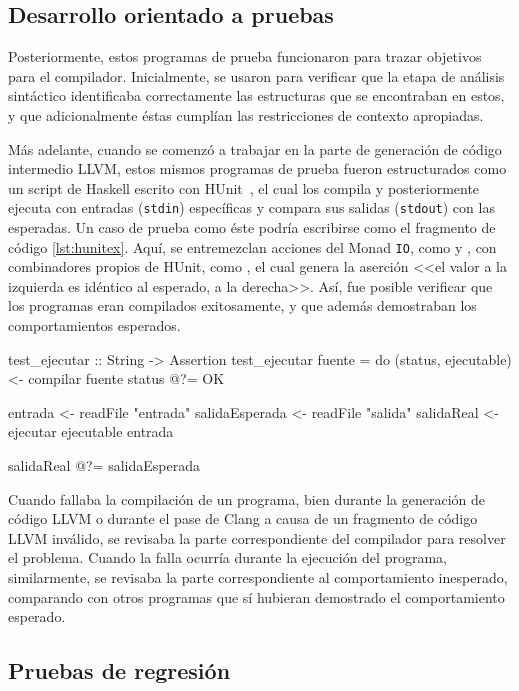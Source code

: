 {{\subsection{Desarrollo orientado a pruebas}

Posteriormente, estos programas de prueba funcionaron para trazar objetivos para
el compilador. Inicialmente, se usaron para verificar que la etapa de análisis
sintáctico identificaba correctamente las estructuras que se  encontraban en
estos, y que adicionalmente éstas cumplían las restricciones de contexto
apropiadas.

Más adelante, cuando se comenzó a trabajar en la parte de generación de código
intermedio LLVM, estos mismos programas de prueba fueron estructurados como un
script de Haskell escrito con HUnit~\cite{hunit}, el cual los compila y
posteriormente ejecuta con entradas (\texttt{stdin}) específicas y compara sus
salidas (\texttt{stdout}) con las esperadas. Un caso de prueba como éste podría
escribirse como el fragmento de código \ref{lst:hunitex}. Aquí, se entremezclan
acciones del Monad \texttt{IO}, como  y 
, con combinadores propios de HUnit, como , 
el cual genera la aserción <<el valor a la izquierda es idéntico al esperado, a
la derecha>>. Así, fue posible verificar que los programas eran compilados
exitosamente, y que además demostraban los comportamientos esperados.

\begin{haskellcode}[caption=Ejemplo de uso de HUnit, label=lst:hunitex]
test_ejecutar :: String -> Assertion
test_ejecutar fuente = do
  (status, ejecutable) <- compilar fuente
  status @?= OK

  entrada <- readFile "entrada"
  salidaEsperada <- readFile "salida"
  salidaReal <- ejecutar ejecutable entrada

  salidaReal @?= salidaEsperada
\end{haskellcode}

Cuando fallaba la compilación de un programa, bien durante la generación de
código LLVM o durante el pase de Clang a causa de un fragmento de código LLVM
inválido, se revisaba la parte correspondiente del compilador para resolver el
problema. Cuando la falla ocurría durante la ejecución del programa,
similarmente, se revisaba la parte correspondiente al comportamiento inesperado,
comparando con otros programas que sí hubieran  demostrado el comportamiento
esperado.

\subsection{Pruebas de regresión}

}}
